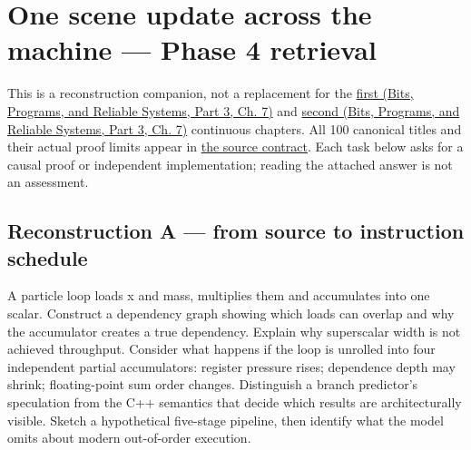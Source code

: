 \hypertarget{appendix-2587680a4fe3}{}\label{referencestart:appendix-2587680a4fe3}
\section{One scene update across the machine --- Phase 4 retrieval}\label{appendix-2587680a4fe3-one-scene-update-across-the-machine-phase-4-retrieval}

\hypertarget{appendix-2587680a4fe3-one-scene-update-across-the-machine-phase-4-retrieval}{}

This is a reconstruction companion, not a replacement for the \href{../01-Bits-Programs-and-Reliable-Systems-P03/main.pdf\#nameddest=01-foundations-i-ch007-from-a-correct-c-asset-service-to-the-instructions-a-cpu-can-execute-phase-4-m019m021-parts-301346}{first (Bits, Programs, and Reliable Systems, Part 3, Ch. 7)} and \href{../01-Bits-Programs-and-Reliable-Systems-P03/main.pdf\#nameddest=01-foundations-i-ch007-from-temporary-memory-to-finished-parallel-frames-phase-4-m022m024-parts-347400}{second (Bits, Programs, and Reliable Systems, Part 3, Ch. 7)} continuous chapters. All 100 canonical titles and their actual proof limits appear in \hyperref[appendix-fd090d982a15-phase-4-cpu-architecture-and-measured-execution-parts-301400]{the source contract}. Each task below asks for a causal proof or independent implementation; reading the attached answer is not an assessment.

\subsection{Reconstruction A --- from source to instruction schedule}\label{appendix-2587680a4fe3-reconstruction-a-from-source-to-instruction-schedule}

\hypertarget{appendix-2587680a4fe3-reconstruction-a-from-source-to-instruction-schedule}{}

A particle loop loads x and mass, multiplies them and accumulates into one scalar. Construct a dependency graph showing which loads can overlap and why the accumulator creates a true dependency. Explain why superscalar width is not achieved throughput. Consider what happens if the loop is unrolled into four independent partial accumulators: register pressure rises; dependence depth may shrink; floating-point sum order changes. Distinguish a branch predictor's speculation from the C++ semantics that decide which results are architecturally visible. Sketch a hypothetical five-stage pipeline, then identify what the model omits about modern out-of-order execution.

